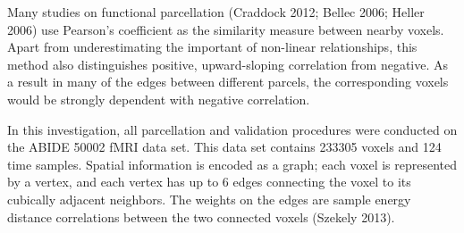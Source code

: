 Many studies on functional parcellation (Craddock 2012; Bellec 2006;
Heller 2006) use Pearson's coefficient as the similarity measure between
nearby voxels. Apart from underestimating the important of non-linear
relationships, this method also distinguishes positive, upward-sloping
correlation from negative. As a result in many of the edges between
different parcels, the corresponding voxels would be strongly dependent
with negative correlation.

In this investigation, all parcellation and validation procedures were
conducted on the ABIDE 50002 fMRI data set. This data set contains
233305 voxels and 124 time samples. Spatial information is encoded as a
graph; each voxel is represented by a vertex, and each vertex has up to
6 edges connecting the voxel to its cubically adjacent neighbors. The
weights on the edges are sample energy distance correlations between the
two connected voxels (Szekely 2013).
